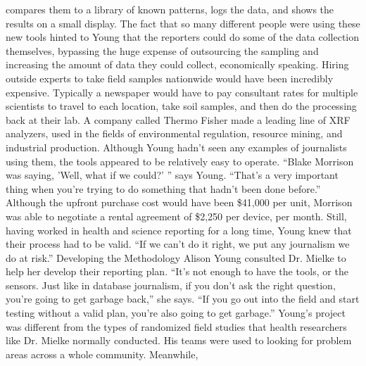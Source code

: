 compares them to a library of known patterns, logs the data, and shows
the results on a small display. The fact that so many different people were
using these new tools hinted to Young that the reporters could do some of
the data collection themselves, bypassing the huge expense of outsourcing
the sampling and increasing the amount of data they could collect, economically
speaking. Hiring outside experts to take field samples nationwide
would have been incredibly expensive. Typically a newspaper would have to
pay consultant rates for multiple scientists to travel to each location, take
soil samples, and then do the processing back at their lab.
A company called Thermo Fisher made a leading line of XRF analyzers, used
in the fields of environmental regulation, resource mining, and industrial
production. Although Young hadn't seen any examples of journalists using
them, the tools appeared to be relatively easy to operate. ``Blake Morrison
was saying, 'Well, what if we could?' '' says Young. ``That's a very important
thing when you're trying to do something that hadn't been done before.''
Although the upfront purchase cost would have been \$41,000 per unit,
Morrison was able to negotiate a rental agreement of \$2,250 per device, per
month. Still, having worked in health and science reporting for a long time,
Young knew that their process had to be valid. ``If we can't do it right, we put
any journalism we do at risk.''
Developing the Methodology
Alison Young consulted Dr. Mielke to help her develop their reporting plan.
``It's not enough to have the tools, or the sensors. Just like in database journalism,
if you don't ask the right question, you're going to get garbage back,''
she says. ``If you go out into the field and start testing without a valid plan,
you're also going to get garbage.''
Young's project was different from the types of randomized field studies
that health researchers like Dr. Mielke normally conducted. His teams were
used to looking for problem areas across a whole community. Meanwhile,

